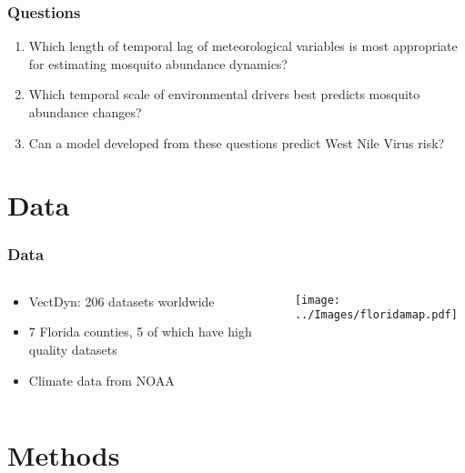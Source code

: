 \documentclass{beamer}
\begin{document}
\begin{frame}
\frametitle{Questions}

\begin{enumerate}\Large
	\item Which length of temporal lag of meteorological variables is most appropriate for estimating mosquito abundance dynamics? \vspace{.3cm}
	
	\item Which temporal scale of environmental drivers best predicts mosquito abundance changes? \vspace{.3cm}
	
	\item Can a model developed from these questions predict West Nile Virus risk?
	\vspace{1cm}
	
\end{enumerate}

\end{frame}

\section{Data}

\begin{frame}{}
\frametitle{Data}
\begin{columns}
	\begin{column}{0.5\textwidth}
		\begin{itemize}
			\item VectDyn: 206 datasets worldwide
			\item 7 Florida counties, 5 of which have high quality datasets
			\item Climate data from NOAA
		\end{itemize}
	\vspace{1cm}
	\end{column}
	\begin{column}{0.5\textwidth}  %
		\begin{center}
			\texttt{[image: ../Images/floridamap.pdf]}
		\end{center}
	\vspace{1cm}
	\end{column}
\end{columns}
	
\end{frame}

\section{Methods}
\end{document}
